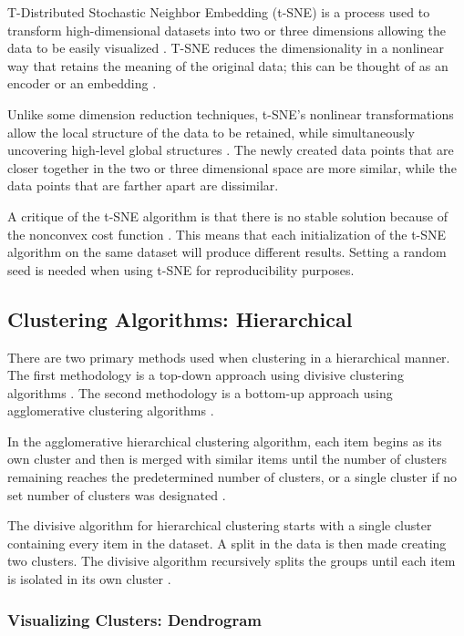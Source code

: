 \documentclass[5p,authoryear]{elsarticle}
\begin{document}
T-Distributed Stochastic Neighbor Embedding (t-SNE) is a process used to transform high-dimensional datasets into two or three dimensions allowing the data to be easily visualized \citep{handsOn}.  
T-SNE reduces the dimensionality in a nonlinear way that retains the meaning of the original data; this can be thought of as an encoder or an embedding \citep{lane}. 

Unlike some dimension reduction techniques, t-SNE's nonlinear transformations allow the local structure of the data to be retained, while simultaneously uncovering high-level global structures \citep{TSNE}. 
The newly created data points that are closer together in the two or three dimensional space are more similar, while the data points that are farther apart are dissimilar. 

A critique of the t-SNE algorithm is that there is no stable solution because of the nonconvex cost function \citep{handsOn}. 
This means that each initialization of the t-SNE algorithm on the same dataset will produce different results.
Setting a random seed is needed when using t-SNE for reproducibility purposes. 




\subsection{Clustering Algorithms: Hierarchical}\label{dendro}


There are two primary methods used when clustering in a hierarchical manner. 
The first methodology is a top-down approach using divisive clustering algorithms \citep{multivariate}.
The second methodology is a bottom-up approach using agglomerative clustering algorithms \citep{multivariate}.

In the agglomerative hierarchical clustering algorithm, each item begins as its own cluster and then is merged with similar items until the number of clusters remaining reaches the predetermined number of clusters, or a single cluster if no set number of clusters was designated \citep{Cookbook}. 

The divisive algorithm for hierarchical clustering starts with a single cluster containing every item in the dataset. 
A split in the data is then made creating two clusters. 
The divisive algorithm recursively splits the groups until each item is isolated in its own cluster \citep{multivariate}.

\subsubsection{Visualizing Clusters: Dendrogram}\label{Dendrogram}
\end{document}
